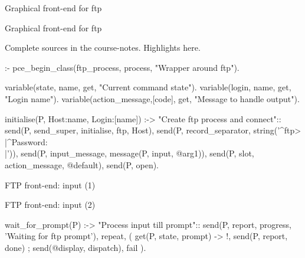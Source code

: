 \begin{sli}{Graphical front-end for ftp}


\end{sli}



\begin{sli}{Graphical front-end for ftp}

Complete sources in the course-notes.  Highlights here.


\begin{code}
:- pce_begin_class(ftp_process, process,
                   "Wrapper around ftp").

variable(state,         name,   get,
         "Current command state").
variable(login,         name,   get,
         "Login name").
variable(action_message,[code], get,
         "Message to handle output").

initialise(P, Host:name, Login:[name]) :->
        "Create ftp process and connect"::
        send(P, send_super, initialise, ftp, Host),
        send(P, record_separator,
             string('^ftp> \\|^Password:\\|\n')),
        send(P, input_message,
             message(P, input, @arg1)),
        send(P, slot, action_message, @default),
        send(P, open).
\end{code}

\noindent
\end{sli}

\begin{sli}{FTP front-end: input (1)}


\noindent
\end{sli}


\begin{sli}{FTP front-end: input (2)}
\begin{code}
wait_for_prompt(P) :->
        "Process input till prompt"::
        send(P, report, progress, 'Waiting for ftp prompt'),
        repeat,
        (   get(P, state, prompt)
        ->  !,
            send(P, report, done)
        ;   send(@display, dispatch),
            fail
        ).
\end{code}

\noindent
\end{sli}


